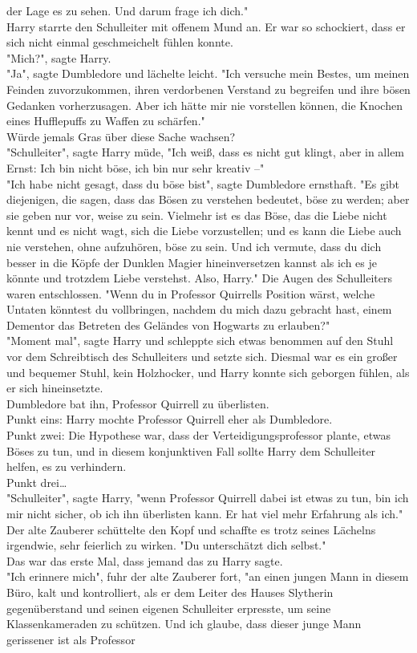 {der Lage es zu sehen. Und darum frage ich dich."\\ Harry starrte den Schulleiter mit offenem Mund an. Er war so schockiert, dass er sich nicht einmal geschmeichelt fühlen konnte.\\ "Mich?", sagte Harry.\\ "Ja", sagte Dumbledore und lächelte leicht. "Ich versuche mein Bestes, um meinen Feinden zuvorzukommen, ihren verdorbenen Verstand zu begreifen und ihre bösen Gedanken vorherzusagen. Aber ich hätte mir nie vorstellen können, die Knochen eines Hufflepuffs zu Waffen zu schärfen."\\ Würde jemals Gras über diese Sache wachsen?\\ "Schulleiter", sagte Harry müde, "Ich weiß, dass es nicht gut klingt, aber in allem Ernst: Ich bin nicht böse, ich bin nur sehr kreativ --"\\ "Ich habe nicht gesagt, dass du böse bist", sagte Dumbledore ernsthaft. "Es gibt diejenigen, die sagen, dass das Bösen zu verstehen bedeutet, böse zu werden; aber sie geben nur vor, weise zu sein. Vielmehr ist es das Böse, das die Liebe nicht kennt und es nicht wagt, sich die Liebe vorzustellen; und es kann die Liebe auch nie verstehen, ohne aufzuhören, böse zu sein. Und ich vermute, dass du dich besser in die Köpfe der Dunklen Magier hineinversetzen kannst als ich es je könnte und trotzdem Liebe verstehst. Also, Harry." Die Augen des Schulleiters waren entschlossen. "Wenn du in Professor Quirrells Position wärst, welche Untaten könntest du vollbringen, nachdem du mich dazu gebracht hast, einem Dementor das Betreten des Geländes von Hogwarts zu erlauben?"\\ "Moment mal", sagte Harry und schleppte sich etwas benommen auf den Stuhl vor dem Schreibtisch des Schulleiters und setzte sich. Diesmal war es ein großer und bequemer Stuhl, kein Holzhocker, und Harry konnte sich geborgen fühlen, als er sich hineinsetzte.\\ Dumbledore bat ihn, Professor Quirrell zu überlisten.\\ Punkt eins: Harry mochte Professor Quirrell eher als Dumbledore.\\ Punkt zwei: Die Hypothese war, dass der Verteidigungsprofessor plante, etwas Böses zu tun, und in diesem konjunktiven Fall sollte Harry dem Schulleiter helfen, es zu verhindern.\\ Punkt drei…\\ "Schulleiter", sagte Harry, "wenn Professor Quirrell dabei ist etwas zu tun, bin ich mir nicht sicher, ob ich ihn überlisten kann. Er hat viel mehr Erfahrung als ich."\\ Der alte Zauberer schüttelte den Kopf und schaffte es trotz seines Lächelns irgendwie, sehr feierlich zu wirken. "Du unterschätzt dich selbst."\\ Das war das erste Mal, dass jemand das zu Harry sagte.\\ "Ich erinnere mich", fuhr der alte Zauberer fort, "an einen jungen Mann in diesem Büro, kalt und kontrolliert, als er dem Leiter des Hauses Slytherin gegenüberstand und seinen eigenen Schulleiter erpresste, um seine Klassenkameraden zu schützen. Und ich glaube, dass dieser junge Mann gerissener ist als Professor }
